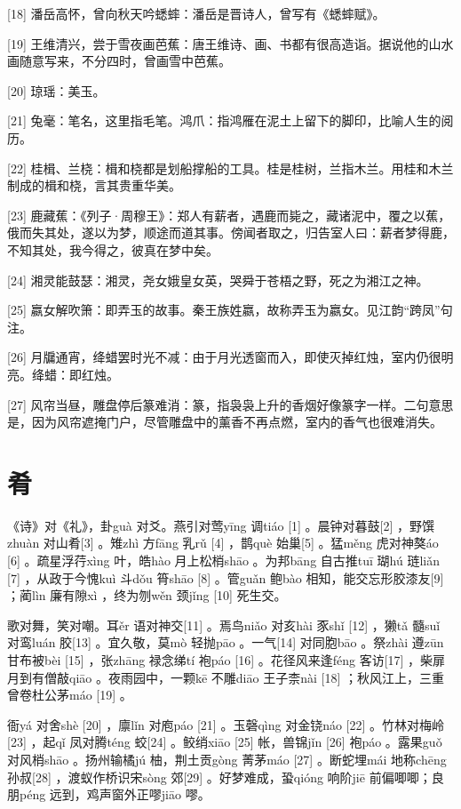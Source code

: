 \documentclass[12pt,UTF8]{ctexbook}
\begin{document}
[18] 潘岳高怀，曾向秋天吟蟋蟀：潘岳是晋诗人，曾写有《蟋蟀赋》。

[19] 王维清兴，尝于雪夜画芭蕉：唐王维诗、画、书都有很高造诣。据说他的山水画随意写来，不分四时，曾画雪中芭蕉。

[20] 琼瑶：美玉。

[21] 兔毫：笔名，这里指毛笔。鸿爪：指鸿雁在泥土上留下的脚印，比喻人生的阅历。

[22] 桂楫、兰桡：楫和桡都是划船撑船的工具。桂是桂树，兰指木兰。用桂和木兰制成的楫和桡，言其贵重华美。

[23] 鹿藏蕉：《列子·周穆王》：郑人有薪者，遇鹿而毙之，藏诸泥中，覆之以蕉，俄而失其处，遂以为梦，顺途而道其事。傍闻者取之，归告室人曰：薪者梦得鹿，不知其处，我今得之，彼真在梦中矣。

[24] 湘灵能鼓瑟：湘灵，尧女娥皇女英，哭舜于苍梧之野，死之为湘江之神。

[25] 嬴女解吹箫：即弄玉的故事。秦王族姓嬴，故称弄玉为嬴女。见江韵“跨凤”句注。

[26] 月牖通宵，绛蜡罢时光不减：由于月光透窗而入，即使灭掉红烛，室内仍很明亮。绛蜡：即红烛。

[27] 风帘当昼，雕盘停后篆难消：篆，指袅袅上升的香烟好像篆字一样。二句意思是，因为风帘遮掩门户，尽管雕盘中的薰香不再点燃，室内的香气也很难消失。





\chapter{肴}


《诗》对《礼》，卦guà 对爻。燕引对莺yīng 调tiáo [1] 。晨钟对暮鼓[2] ，野馔zhuàn 对山肴[3] 。雉zhì 方fāng 乳rǔ [4] ，鹊què 始巢[5] 。猛měng 虎对神獒áo [6] 。疏星浮荇xìng 叶，皓hào 月上松梢shāo 。为邦bāng 自古推tuī 瑚hú 琏liǎn [7] ，从政于今愧kuì 斗dǒu 筲shāo [8] 。管guǎn 鲍bào 相知，能交忘形胶漆友[9] ；蔺lìn 廉有隙xì ，终为刎wěn 颈jǐng [10] 死生交。

歌对舞，笑对嘲。耳ěr 语对神交[11] 。焉鸟niǎo 对亥hài 豕shǐ [12] ，獭tǎ 髓suǐ 对鸾luán 胶[13] 。宜久敬，莫mò 轻抛pāo 。一气[14] 对同胞bāo 。祭zhài 遵zūn 甘布被bèi [15] ，张zhāng 禄念绨tí 袍páo [16] 。花径风来逢féng 客访[17] ，柴扉月到有僧敲qiāo 。夜雨园中，一颗kē 不雕diāo 王子柰nài [18] ；秋风江上，三重曾卷杜公茅máo [19] 。

衙yá 对舍shè [20] ，廪lǐn 对庖páo [21] 。玉磬qìng 对金铙náo [22] 。竹林对梅岭[23] ，起qǐ 凤对腾téng 蛟[24] 。鲛绡xiāo [25] 帐，兽锦jǐn [26] 袍páo 。露果guǒ 对风梢shāo 。扬州输橘jú 柚，荆土贡gòng 菁茅máo [27] 。断蛇埋mái 地称chēng 孙叔[28] ，渡蚁作桥识宋sòng 郊[29] 。好梦难成，蛩qióng 响阶jiē 前偏唧唧；良朋péng 远到，鸡声窗外正嘐jiāo 嘐。
\end{document}
